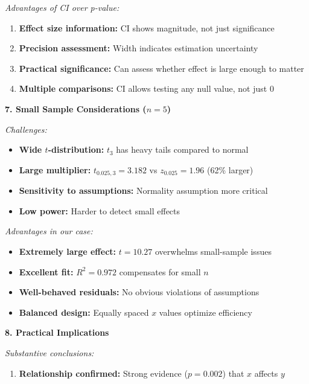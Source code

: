 \documentclass[12pt]{article}
\begin{document}
\begin{explanation}
\textit{Advantages of CI over p-value:}

\begin{enumerate}
    \item \textbf{Effect size information:} CI shows magnitude, not just significance
    \item \textbf{Precision assessment:} Width indicates estimation uncertainty
    \item \textbf{Practical significance:} Can assess whether effect is large enough to matter
    \item \textbf{Multiple comparisons:} CI allows testing any null value, not just 0
\end{enumerate}

\textbf{7. Small Sample Considerations ($n = 5$)}

\textit{Challenges:}

\begin{itemize}
    \item \textbf{Wide $t$-distribution:} $t_3$ has heavy tails compared to normal
    \item \textbf{Large multiplier:} $t_{0.025,3} = 3.182$ vs $z_{0.025} = 1.96$ (62\% larger)
    \item \textbf{Sensitivity to assumptions:} Normality assumption more critical
    \item \textbf{Low power:} Harder to detect small effects
\end{itemize}

\textit{Advantages in our case:}

\begin{itemize}
    \item \textbf{Extremely large effect:} $t = 10.27$ overwhelms small-sample issues
    \item \textbf{Excellent fit:} $R^2 = 0.972$ compensates for small $n$
    \item \textbf{Well-behaved residuals:} No obvious violations of assumptions
    \item \textbf{Balanced design:} Equally spaced $x$ values optimize efficiency
\end{itemize}

\textbf{8. Practical Implications}

\textit{Substantive conclusions:}

\begin{enumerate}
    \item \textbf{Relationship confirmed:} Strong evidence ($p = 0.002$) that $x$ affects $y$


\end{enumerate}
\end{explanation}
\end{document}
